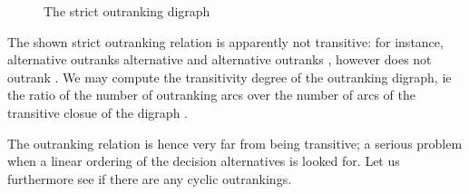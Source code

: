 \documentclass[a4paper,10pt,english]{sphinxhowto}
\let\sphinxpxdimen\pdfpxdimen\else\newdimen\sphinxpxdimen
\begin{document}
\begin{sphinxVerbatim}[commandchars=\\\{\},numbers=left,firstnumber=1,stepnumber=1]
   
\end{sphinxVerbatim}

\begin{figure}[htbp]
\centering
\capstart

\noindent\sphinxincludegraphics[width=400\sphinxpxdimen]{{rankingTutorial}.png}
\caption{The strict outranking digraph}\label{\detokenize{tutorial:id120}}\end{figure}

The shown strict outranking relation is apparently not transitive: for instance, alternative  outranks alternative  and alternative  outranks , however  does not outrank . We may compute the transitivity degree of the outranking digraph, ie the ratio of the number of outranking arcs over the number of arcs of the transitive closue of the digraph .

\begin{sphinxVerbatim}[commandchars=\\\{\}]
\end{sphinxVerbatim}

The outranking relation is hence very far from being transitive; a serious problem when a linear ordering of the decision alternatives is looked for. Let us furthermore see if there are any cyclic outrankings.

\begin{sphinxVerbatim}[commandchars=\\\{\},numbers=left,firstnumber=1,stepnumber=1]
\end{sphinxVerbatim}
\end{document}
